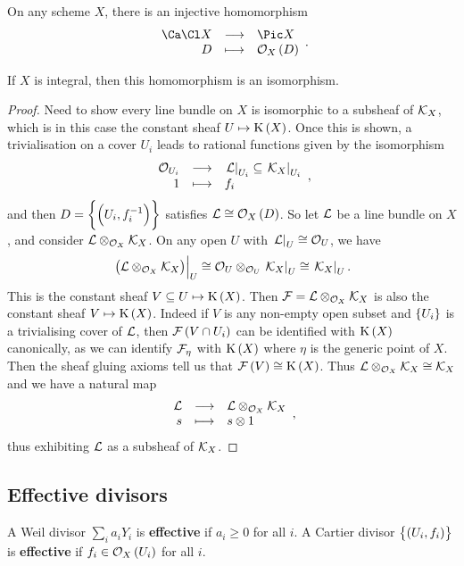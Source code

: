 \begin{corollary}
On any scheme $ X $, there is an injective homomorphism
$$ \function{\Ca\Cl X}{\Pic X}{D}{\OOO_X\br{D}}. $$
\end{corollary}

\begin{proposition}
If $ X $ is integral, then this homomorphism is an isomorphism.
\end{proposition}

\begin{proof}
Need to show every line bundle on $ X $ is isomorphic to a subsheaf of $ \mathcal{K}_X $, which is in this case the constant sheaf $ U \mapsto \K\br{X} $. Once this is shown, a trivialisation on a cover $ U_i $ leads to rational functions given by the isomorphism
$$ \function{\OOO_{U_i}}{\eval{\LLL}_{U_i} \subseteq \eval{\KKK_X}_{U_i}}{1}{f_i}, $$
and then $ D = \cbr{\br{U_i, f_i^{-1}}} $ satisfies $ \LLL \cong \OOO_X\br{D} $. So let $ \mathcal{L} $ be a line bundle on $ X $, and consider $ \mathcal{L} \otimes_{\mathcal{O}_X} \mathcal{K}_X $. On any open $ U $ with $ \left. \mathcal{L} \right|_U \cong \mathcal{O}_U $, we have
$$ \eval{\br{\LLL \otimes_{\OOO_X} \KKK_X}}_U \cong \OOO_U \otimes_{\OOO_U} \eval{\KKK_X}_U \cong \eval{\KKK_X}_U. $$
This is the constant sheaf $ V \subseteq U \mapsto \K\br{X} $. Then $ \mathcal{F} = \mathcal{L} \otimes_{\mathcal{O}_X} \mathcal{K}_X $ is also the constant sheaf $ V \mapsto \K\br{X} $. Indeed if $ V $ is any non-empty open subset and $ \cbr{U_i} $ is a trivialising cover of $ \mathcal{L} $, then $ \FFF\br{V \cap U_i} $ can be identified with $ \K\br{X} $ canonically, as we can identify $ \mathcal{F}_\eta $ with $ \K\br{X} $ where $ \eta $ is the generic point of $ X $. Then the sheaf gluing axioms tell us that $ \FFF\br{V} \cong \K\br{X} $. Thus $ \mathcal{L} \otimes_{\mathcal{O}_X} \mathcal{K}_X \cong \mathcal{K}_X $ and we have a natural map
$$ \function{\LLL}{\LLL \otimes_{\OOO_X} \KKK_X}{s}{s \otimes 1}, $$
thus exhibiting $ \mathcal{L} $ as a subsheaf of $ \mathcal{K}_X $.
\end{proof}

\subsection{Effective divisors}

\begin{definition*}
A Weil divisor $ \sum_i a_iY_i $ is \textbf{effective} if $ a_i \ge 0 $ for all $ i $. A Cartier divisor $ \cbr{\br{U_i, f_i}} $ is \textbf{effective} if $ f_i \in \OOO_X\br{U_i} $ for all $ i $.
\end{definition*}

